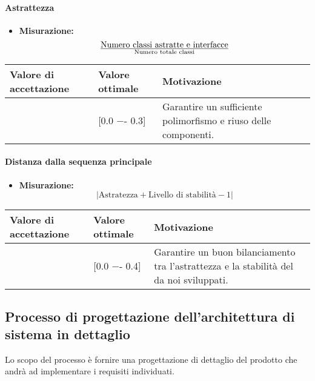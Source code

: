 \paragraph{Astrattezza}

\begin{itemize}
\item \textbf{Misurazione:}
\begin{displaymath}
{\text{Numero classi astratte e interfacce}}\over{\text{Numero totale classi}}
\end{displaymath}
\end{itemize}

\begin{center}
		\begin{tabular}{|P{2.5cm}|P{2.5cm}|P{6cm}|}
		\hline
			\textbf{Valore di accettazione}	& \textbf{Valore ottimale} & \textbf{Motivazione} \\
			\hline
			[0.0 −- 0.8] & [0.0 −- 0.3] &	Garantire un sufficiente polimorfismo e riuso delle componenti. \\
			\hline
			\end{tabular}
\end{center}

\paragraph{Distanza dalla sequenza principale}

\begin{itemize}
\item \textbf{Misurazione:}
\begin{displaymath}
{|\text{Astratezza} + \text{Livello di stabilità} - 1|}
\end{displaymath}
\end{itemize}

\begin{center}
		\begin{tabular}{|P{2.5cm}|P{2.5cm}|P{6cm}|}
		\hline
			\textbf{Valore di accettazione}	& \textbf{Valore ottimale} & \textbf{Motivazione} \\
			\hline
			[0.0 −- 1] & [0.0 −- 0.4] &	Garantire un buon bilanciamento tra l’astrattezza e la stabilità del  da noi sviluppati.\\
			\hline
			\end{tabular}
\end{center}

\subsection{Processo di progettazione dell'architettura di sistema in dettaglio}
Lo scopo del processo è fornire una progettazione di dettaglio del prodotto che andrà ad implementare i requisiti individuati.
